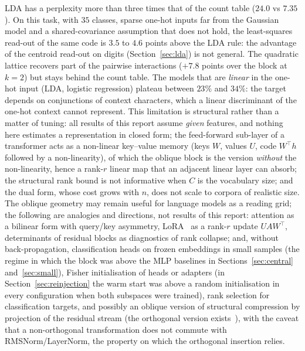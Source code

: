 \documentclass[11pt,a4paper]{article}
\theoremstyle{plain}
\theoremstyle{definition}
\theoremstyle{remark}
\newcommand{\T}{\top}
\begin{document}
LDA has a perplexity more than three times that of the count table ($24.0$
vs $7.35$). On this task, with $35$ classes, sparse one-hot inputs far from
the Gaussian model and a shared-covariance assumption that does not hold,
the least-squares read-out of the same code is $3.5$ to $4.6$ points above
the LDA rule: the advantage of the centroid read-out on digits
(Section~\ref{sec:lda}) is not general. The quadratic lattice recovers
part of the pairwise interactions ($+7.8$ points over the block at $k=2$)
but stays behind the count table. The models that are \emph{linear} in the
one-hot input (LDA, logistic regression) plateau between $23\%$ and
$34\%$: the target
depends on conjunctions of context characters, which a linear discriminant
of the one-hot context cannot represent. This limitation is structural
rather than a matter of tuning: all results of this report assume
\emph{given} features, and nothing here estimates a representation in
closed form; the feed-forward sub-layer of a transformer acts as a
non-linear key--value memory (keys $W$, values $U$, code $W^\T h$ followed
by a non-linearity), of which the oblique block is the version
\emph{without} the non-linearity, hence a rank-$r$ linear map that an
adjacent linear layer can absorb; the structural rank bound is not
informative when $C$ is the vocabulary size; and the dual form, whose cost
grows with $n$, does not scale to corpora of realistic size. The oblique
geometry may remain useful for language models as a reading grid; the
following are analogies and directions, not results of this report:
attention as a bilinear form with query/key asymmetry, LoRA~\cite{hu2022lora}
as a rank-$r$ update $UAW^\T$, determinants of residual blocks as
diagnostics of rank collapse; and, without back-propagation, classification heads on
frozen embeddings in small samples (the regime in which the block was
above the MLP baselines in Sections~\ref{sec:central}
and~\ref{sec:small}), Fisher initialisation of heads or adapters (in
Section~\ref{sec:reinjection} the warm start was above a random
initialisation in every configuration when both subspaces were trained),
rank selection for classification targets,
and possibly an oblique version of structural compression by projection of
the residual stream (the orthogonal version
exists~\cite{ashkboos2024slicegpt}), with the caveat that a non-orthogonal
transformation does not commute with RMSNorm/LayerNorm, the property on
which the orthogonal insertion relies.

\end{document}
